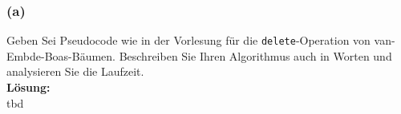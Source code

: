 \subsubsection*{(a)}


Geben Sei Pseudocode wie in der Vorlesung für die \lstinline|delete|-Operation von van-Embde-Boas-Bäumen. Beschreiben Sie Ihren Algorithmus auch in Worten und analysieren Sie die Laufzeit.\\

\noindent\textbf{Lösung:}\\

tbd



